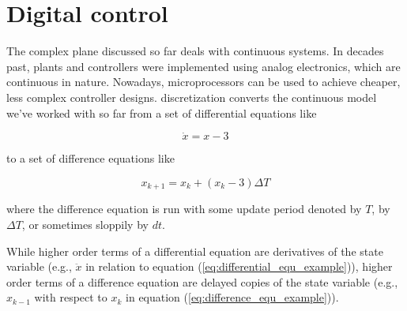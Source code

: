 
\chapter{Digital control} \label{ch:digital_control}

The complex plane discussed so far deals with continuous \glspl{system}. In
decades past, \glspl{plant} and controllers were implemented using analog
electronics, which are continuous in nature. Nowadays, microprocessors can be
used to achieve cheaper, less complex controller designs. \Gls{discretization}
converts the continuous \gls{model} we've worked with so far from a set of
differential equations like

\begin{equation}
  \dot{x} = x - 3 \label{eq:differential_equ_example}
\end{equation}

to a set of difference equations like

\begin{equation}
  x_{k+1} = x_k + (x_k - 3) \Delta T \label{eq:difference_equ_example}
\end{equation}

where the difference equation is run with some update period denoted by $T$, by
$\Delta T$, or sometimes sloppily by $dt$.

While higher order terms of a differential equation are derivatives of the
\gls{state} variable (e.g., $\ddot{x}$ in relation to equation
(\ref{eq:differential_equ_example})), higher order terms of a difference
equation are delayed copies of the \gls{state} variable (e.g., $x_{k-1}$ with
respect to $x_k$ in equation (\ref{eq:difference_equ_example})).








